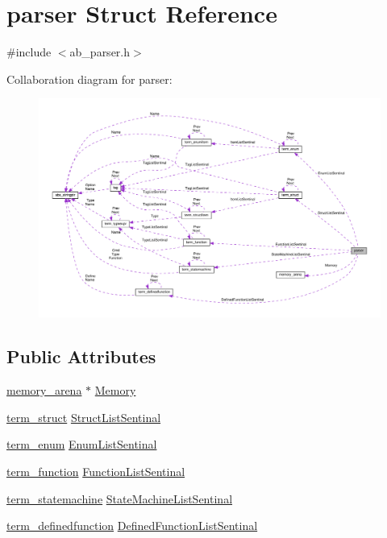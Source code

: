 \hypertarget{structparser}{}\section{parser Struct Reference}
\label{structparser}


{\ttfamily \#include $<$ab\+\_\+parser.\+h$>$}



Collaboration diagram for parser\+:\nopagebreak
\begin{figure}[H]
\begin{center}
\leavevmode
\includegraphics[width=350pt]{d1/d68/structparser__coll__graph}
\end{center}
\end{figure}
\subsection*{Public Attributes}
\begin{DoxyCompactItemize}
\item 
\hyperlink{structmemory__arena}{memory\+\_\+arena} $\ast$ \hyperlink{structparser_ae92434364d983495b64df17550f40d27}{Memory}
\item 
\hyperlink{structterm__struct}{term\+\_\+struct} \hyperlink{structparser_accfacf760af582468d591a06259406be}{Struct\+List\+Sentinal}
\item 
\hyperlink{structterm__enum}{term\+\_\+enum} \hyperlink{structparser_a8023ac3e70ded1ba71e6a2974a9e22b6}{Enum\+List\+Sentinal}
\item 
\hyperlink{structterm__function}{term\+\_\+function} \hyperlink{structparser_a43e51e28e997b7acf6121eb6e6a894f1}{Function\+List\+Sentinal}
\item 
\hyperlink{structterm__statemachine}{term\+\_\+statemachine} \hyperlink{structparser_aa29d6dda9d3d933604823ec27584f162}{State\+Machine\+List\+Sentinal}
\item 
\hyperlink{structterm__definedfunction}{term\+\_\+definedfunction} \hyperlink{structparser_a536dbd6d3a451a05b2365772bd5533a5}{Defined\+Function\+List\+Sentinal}
\end{DoxyCompactItemize}


